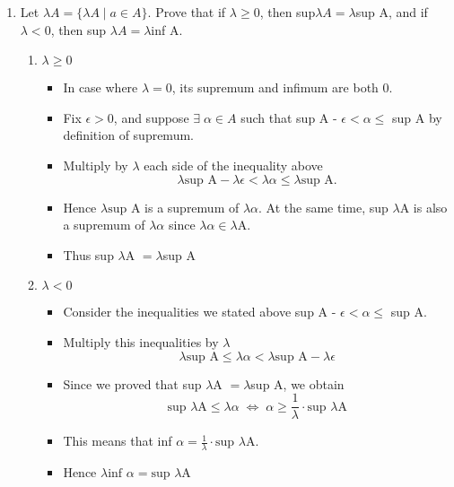 \documentclass[12pt]{article}
\begin{document}
\begin{enumerate}[label=(\alph*)]
    \item Let $\lambda A = \{\lambda A \; | \; a \in A \}.$ Prove that if $\lambda \ge 0$, then sup$\lambda A = \lambda$sup A, and if $\lambda < 0$, then sup $\lambda A = \lambda$inf A. 
    
    \begin{enumerate}[label=\roman*.]
        \item $\lambda \ge 0$
            \begin{itemize}
                \item In case where $\lambda = 0$, its supremum and infimum are both 0.
                \item Fix $\epsilon > 0$, and suppose $\exists\; \alpha \in A$ such that sup A - $\epsilon < \alpha \le$ sup A by definition of supremum.
                \item Multiply by $\lambda$ each side of the inequality above \\
                      $$\lambda \text{sup A} - \lambda\epsilon < \lambda\alpha \le \lambda \text{sup A}.$$
                \item Hence $\lambda \text{sup A}$ is a supremum of $\lambda\alpha$. At the same time, sup $\lambda$A is also a supremum of $\lambda\alpha$ since $\lambda\alpha \in \lambda$A.
                \item Thus sup $\lambda$A $= \lambda$sup A
            \end{itemize}
        
        \item $\lambda < 0$
            \begin{itemize}
                \item Consider the inequalities we stated above sup A - $\epsilon < \alpha \le$ sup A.
                \item Multiply this inequalities by $\lambda$
                      $$\lambda \text{sup A} \le \lambda\alpha <  \lambda \text{sup A} - \lambda\epsilon$$
                \item Since we proved that sup $\lambda$A $= \lambda$sup A, we obtain $$\text{sup $\lambda$A} \le \lambda\alpha \;\Leftrightarrow\; \alpha \ge \frac{1}{\lambda}\cdot\text{sup $\lambda$A}$$
                \item This means that inf $\alpha = \frac{1}{\lambda}\cdot\text{sup $\lambda$A}$. 
                \item Hence $\lambda\text{inf }\alpha = \text{sup $\lambda$A}$
            \end{itemize}
    \end{enumerate}
    

\end{enumerate}
\end{document}
